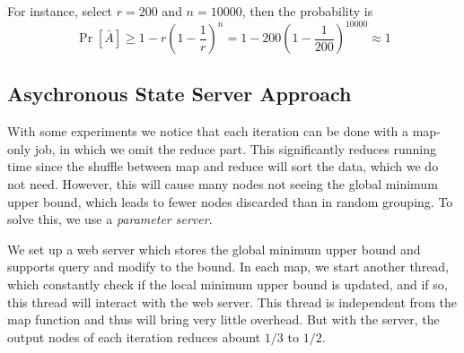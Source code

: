 For instance, select $r=200$ and $n=10000$, then the probability is
\[ \Pr[\bar{A}] \ge 1-r\left(1-\frac{1}{r}\right)^n = 1-200\left(1-\frac{1}{200}\right)^{10000} \approx 1\]


\subsection{Asychronous State Server Approach}
\label{state_server}
    With some experiments we notice that each iteration can be done with a map-only job, in which we omit the reduce part. This significantly reduces running time since the shuffle between map and reduce will sort the data, which we do not need. However, this will cause many nodes not seeing the global minimum upper bound, which leads to fewer nodes discarded than in random grouping. To solve this, we use a \textit{parameter server}.

    We set up a web server which stores the global minimum upper bound and supports query and modify to the bound. In each map, we start another thread, which constantly check if the local minimum upper bound is updated, and if so, this thread will interact with the web server. This thread is independent from the map function and thus will bring very little overhead. But with the server, the output nodes of each iteration reduces abount $1/3$ to $1/2$.
